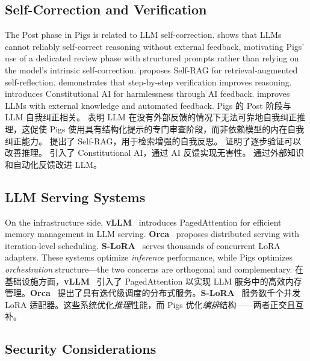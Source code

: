 \subsection{Self-Correction and Verification}

The Post phase in Pigs is related to LLM self-correction. \citet{huang2024selfcorrect} shows that LLMs cannot reliably self-correct reasoning without external feedback, motivating Pigs' use of a dedicated review phase with structured prompts rather than relying on the model's intrinsic self-correction. \citet{asai2023selfrag} proposes Self-RAG for retrieval-augmented self-reflection. \citet{lightman2023verify} demonstrates that step-by-step verification improves reasoning. \citet{bai2022constitutional} introduces Constitutional AI for harmlessness through AI feedback. \citet{peng2023checkfacts} improves LLMs with external knowledge and automated feedback.
Pigs 的 Post 阶段与 LLM 自我纠正相关。\citet{huang2024selfcorrect} 表明 LLM 在没有外部反馈的情况下无法可靠地自我纠正推理，这促使 Pigs 使用具有结构化提示的专门审查阶段，而非依赖模型的内在自我纠正能力。\citet{asai2023selfrag} 提出了 Self-RAG，用于检索增强的自我反思。\citet{lightman2023verify} 证明了逐步验证可以改善推理。\citet{bai2022constitutional} 引入了 Constitutional AI，通过 AI 反馈实现无害性。\citet{peng2023checkfacts} 通过外部知识和自动化反馈改进 LLM。

\subsection{LLM Serving Systems}

On the infrastructure side, \textbf{vLLM}~\citep{kwon2023vllm} introduces PagedAttention for efficient memory management in LLM serving. \textbf{Orca}~\citep{yu2022orca} proposes distributed serving with iteration-level scheduling. \textbf{S-LoRA}~\citep{sheng2023slora} serves thousands of concurrent LoRA adapters. These systems optimize \emph{inference} performance, while Pigs optimizes \emph{orchestration} structure---the two concerns are orthogonal and complementary.
在基础设施方面，\textbf{vLLM}~\citep{kwon2023vllm} 引入了 PagedAttention 以实现 LLM 服务中的高效内存管理。\textbf{Orca}~\citep{yu2022orca} 提出了具有迭代级调度的分布式服务。\textbf{S-LoRA}~\citep{sheng2023slora} 服务数千个并发 LoRA 适配器。这些系统优化\emph{推理}性能，而 Pigs 优化\emph{编排}结构——两者正交且互补。

\subsection{Security Considerations}

